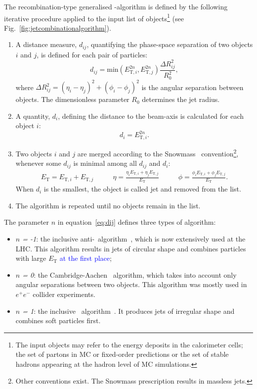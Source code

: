The recombination-type generalised \kt-algorithm is defined by the following iterative procedure applied to the input list of objects\footnote{The input objects may refer to the energy deposits in the calorimeter cells; the set of partons in MC or fixed-order predictions or the set of stable hadrons appearing at the hadron level of MC simulations.} (see Fig.~\ref{fig:jetcombinationalgorithm}).
\begin{enumerate}
	\item A distance measure, $d_{ij}$, quantifying the phase-space separation of two objects $i$ and $j$, is defined for each pair of particles:
	\begin{equation}
	  d_{ij} = \mathrm{\text{min}} \left( E_{\text{T},i}^{2n}, E_{\text{T},j}^{2n} \right) \dfrac{\Delta R_{ij}^2}{R_0^2},
		\label{eq:dij}
	\end{equation}
	where $\Delta R_{ij}^2 = \left( \eta_{i} - \eta_{j} \right)^2 + \left( \phi_{i} - \phi_{j} \right)^2$ is the angular separation between objects. The dimensionless parameter $R_0$ determines the jet radius.
	\item A quantity, $d_i$, defining the distance to the beam-axis is calculated for each object $i$:
		\begin{equation}
	  d_{i} = E_{\text{T},i}^{2n}.
		\label{eq:di}
	\end{equation}
	\item Two objects $i$ and $j$ are merged according to the Snowmass~\cite{proc:snowmass:1990:134} convention\footnote{Other conventions exist. The Snowmass prescription results in massless jets.}, whenever some $d_{ij}$ is minimal among all $d_{ij}$ and $d_{i}$:
	\begin{align}
		E_\text{T} = E_{\text{T},i} + E_{\text{T},j} & \qquad \eta = \frac{\eta_iE_{\text{T},i} + \eta_jE_{\text{T},j}}{E_\text{T}} & \qquad \phi = \frac{\phi_iE_{\text{T},i} + \phi_jE_{\text{T},j}}{E_\text{T}}.			 \label{eq:snowmass}
	\end{align}
	When $d_i$ is the smallest, the object is called jet and removed from the list.
	\item The algorithm is repeated until no objects remain in the list.
\end{enumerate}
The parameter $n$ in equation~\ref{eq:dij} defines three types of algorithm:
\begin{itemize}
	\item \textsl{$n$ = -1}: the inclusive anti-\kt~algorithm~\cite{pub:antikt}, which is now extensively used at the LHC. This algorithm results in jets of circular shape and combines particles with large $E_\text{T}$ \textcolor{blue}{at the first place};
	\item \textsl{$n$ = 0}: the Cambridge-Aachen~\cite{pub:cambidgeaachen} algorithm, which takes into account only angular separations between two objects.  This algorithm was mostly used in $e^+e^-$ collider experiments.
	\item \textsl{$n$ = 1}: the inclusive \kt~algorithm~\cite{pub:kt}. It produces jets of irregular shape and combines soft particles first.
\end{itemize}
